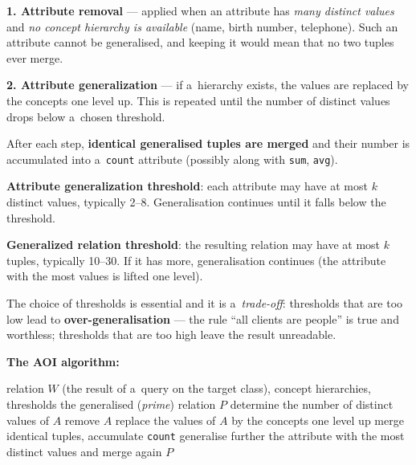 \documentclass[11pt,a4paper]{article}
\theoremstyle{definition}
\providecommand{\uv}[1]{``#1''}
\begin{document}
\begin{defbox}
\textbf{1. Attribute removal} --- applied when an attribute has \emph{many distinct values} and
\emph{no concept hierarchy is available} (name, birth number, telephone). Such an attribute
cannot be generalised, and keeping it would mean that no two tuples ever merge.

\textbf{2. Attribute generalization} --- if a~hierarchy exists, the values are replaced by the
concepts one level up. This is repeated until the number of distinct values drops below
a~chosen threshold.

After each step, \textbf{identical generalised tuples are merged} and their number is
accumulated into a~\texttt{count} attribute (possibly along with \texttt{sum}, \texttt{avg}).
\end{defbox}

\begin{defbox}
\textbf{Attribute generalization threshold}: each attribute may have at most $k$ distinct
values, typically 2--8. Generalisation continues until it falls below the threshold.

\textbf{Generalized relation threshold}: the resulting relation may have at most $k$ tuples,
typically 10--30. If it has more, generalisation continues (the attribute with the most values
is lifted one level).

The choice of thresholds is essential and it is a~\emph{trade-off}: thresholds that are too low
lead to \textbf{over-generalisation} --- the rule \uv{all clients are people} is true and
worthless; thresholds that are too high leave the result unreadable.
\end{defbox}

\noindent\textbf{The AOI algorithm:}
\begin{algorithmic}[1]
\Require relation $W$ (the result of a~query on the target class), concept hierarchies,
  thresholds
\Ensure the generalised (\emph{prime}) relation $P$
  \State determine the number of distinct values of $A$
    \State remove $A$ 
  \Else
      \State replace the values of $A$ by the concepts one level up
    \EndWhile
  \EndIf
\EndFor
\State merge identical tuples, accumulate \texttt{count}
  \State generalise further the attribute with the most distinct values and merge again
\EndWhile
\State \Return $P$
\end{algorithmic}
\end{document}
